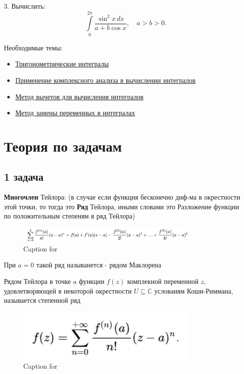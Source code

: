 \documentclass[a4paper,12pt]{article}
\begin{document}
\vspace{0.5cm}

3. Вычислить:
\begin{equation*}
    \int\limits_0^{2\pi} \frac{\sin^2 x \, dx}{a + b \cos x}, \quad a > b > 0.
\end{equation*}

Необходимые темы:
\begin{itemize}
    \item \href{https://ru.wikipedia.org/wiki/Тригонометрические_интегралы}{Тригонометрические 
    интегралы}
    \item \href{https://ru.wikipedia.org/wiki/Комплексный_анализ}{Применение комплексного 
    анализа в вычислении интегралов}
    \item \href{https://ru.wikipedia.org/wiki/Теорема_о_вычетах}{Метод вычетов для 
    вычисления интегралов}
    \item \href{https://ru.wikipedia.org/wiki/Замена_переменных}{Метод замены переменных 
    в интегралах}
\end{itemize}

\newpage
\section{Теория по задачам}
\subsection{1 задача}
\textbf{Многочлен} Тейлора: (в случае если функция бесконечно диф-ма в окрестности
    этой точки, то тогда это \textbf{Ряд} Тейлора, иными словами это Разложение
    функции по положительным степеням в ряд Тейлора)
\begin{figure}[h]     
    \centering     
    \includegraphics[width=0.8\textwidth]{2025-02-24-19-33-49.png}     
    \caption{Caption for }     
    \label{} 
\end{figure}

При $a = 0$ такой ряд называнется - рядом Маклорена

Рядом Тейлора в точке $a$ функции $f(z)$ комплекной переменной $z$, удовлетворяющей в 
    некоторой окрестности $U \subseteq \mathbb{C}$ условаиям Коши-Риммана, называется
    степенной ряд
\begin{figure}[h]     
    \centering     
    \includegraphics[width=0.8\textwidth]{2025-02-24-19-50-22.png}     
    \caption{Caption for }     
    \label{} 
\end{figure}
\end{document}
